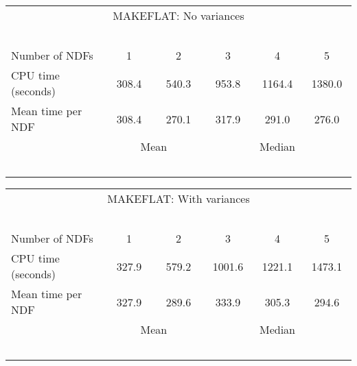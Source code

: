 \begin{center}
   \begin{tabular}{|l||c|c|c|c|c|}
   \multicolumn{6}{c}{MAKEFLAT: No variances} \\
   \multicolumn{6}{l}{~~~}
   \\ \hline
   Number of NDFs    & ~~~1~~~ & ~~~2~~~ & ~~~3~~~ & ~~~4~~~ & ~~~5~~~
    \\ \hline
   CPU time (seconds)&  308.4  & 540.3   & 953.8   &  1164.4 & 1380.0
    \\ \hline
   Mean time per NDF &  308.4  & 270.1   & 317.9   &  291.0  & 276.0
    \\ \hline
   \multicolumn{1}{c}{~~~}
   & \multicolumn{2}{c|}{Mean}
   & \multicolumn{3}{c}{Median}
   \\
   \multicolumn{6}{l}{~~~}
   \\
   \end{tabular}
   \begin{tabular}{|l||c|c|c|c|c|}
   \multicolumn{6}{c}{MAKEFLAT: With variances} \\
   \multicolumn{6}{l}{~~~}
   \\ \hline
   Number of NDFs    & ~~~1~~~ & ~~~2~~~ & ~~~3~~~ & ~~~4~~~ & ~~~5~~~
    \\ \hline
   CPU time (seconds)&  327.9  & 579.2   & 1001.6  & 1221.1   & 1473.1
    \\ \hline
   Mean time per NDF &  327.9  & 289.6   & 333.9   &  305.3   & 294.6
    \\ \hline
   \multicolumn{1}{c}{~~~}
   & \multicolumn{2}{c|}{Mean}
   & \multicolumn{3}{c}{Median}
   \\
   \multicolumn{6}{l}{~~~}
   \\
   \end{tabular}
\end{center}

